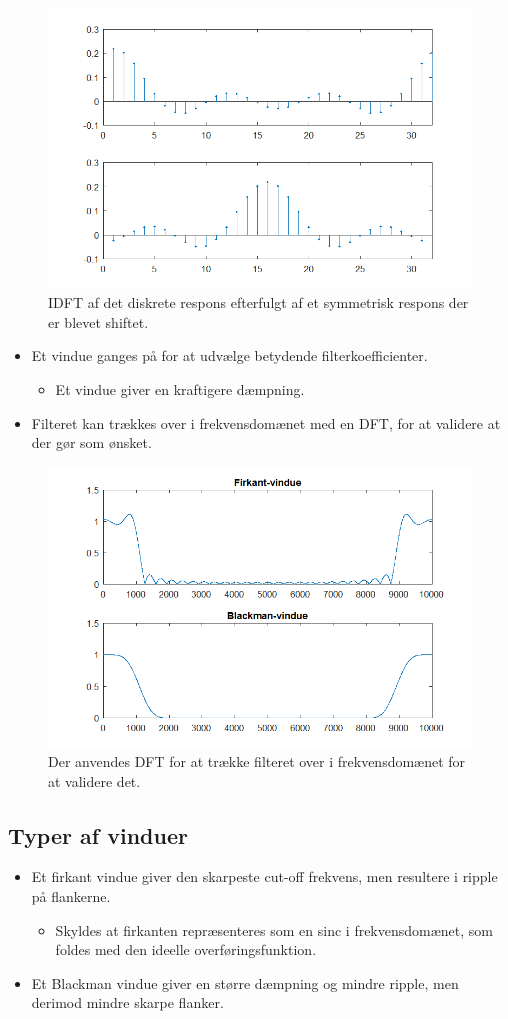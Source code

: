 \documentclass[danish]{article}
\begin{document}
\begin{figure}[H]
	\centering
	\includegraphics[width=0.6\linewidth]{graphics/windowmethod_2}
	\caption{IDFT af det diskrete respons efterfulgt af et symmetrisk respons der er blevet shiftet.}
	\label{fig:windowmethod_2}
\end{figure}

\begin{itemize}
	\item Et vindue ganges på for at udvælge betydende filterkoefficienter.
	\begin{itemize}
		\item Et vindue giver en kraftigere dæmpning.
	\end{itemize}
	\item Filteret kan trækkes over i frekvensdomænet med en DFT, for at validere at der gør som ønsket.
\end{itemize}

\begin{figure}[H]
	\centering
	\includegraphics[width=0.6\linewidth]{graphics/windowmethod_3}
	\caption{Der anvendes DFT for at trække filteret over i frekvensdomænet for at validere det.}
	\label{fig:windowmethod_3}
\end{figure}

\subsection{Typer af vinduer}
\begin{itemize}
	\item Et firkant vindue giver den skarpeste cut-off frekvens, men resultere i ripple på flankerne.
	\begin{itemize}
		\item Skyldes at firkanten repræsenteres som en sinc i frekvensdomænet, som foldes med den ideelle overføringsfunktion.
	\end{itemize}
	\item Et Blackman vindue giver en større dæmpning og mindre ripple, men derimod mindre skarpe flanker.
\end{itemize}
\end{document}
